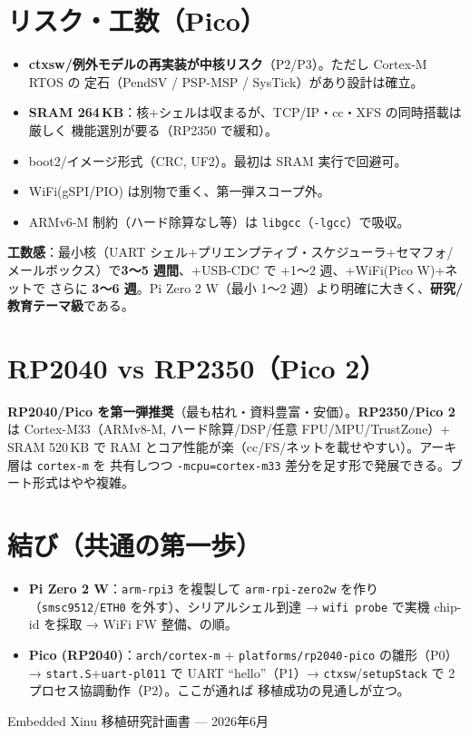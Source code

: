 \documentclass[a4paper,11pt]{ltjsarticle}
\newcommand{\cmd}[1]{\texttt{#1}}
\begin{document}
\section{リスク・工数（Pico）}
\begin{itemize}[noitemsep]
  \item \textbf{ctxsw/例外モデルの再実装が中核リスク}（P2/P3）。ただし Cortex-M RTOS の
        定石（PendSV / PSP-MSP / SysTick）があり設計は確立。
  \item \textbf{SRAM 264\,KB}：核+シェルは収まるが、TCP/IP・cc・XFS の同時搭載は厳しく
        機能選別が要る（RP2350 で緩和）。
  \item boot2/イメージ形式（CRC, UF2）。最初は SRAM 実行で回避可。
  \item WiFi(gSPI/PIO) は別物で重く、第一弾スコープ外。
  \item ARMv6-M 制約（ハード除算なし等）は \texttt{libgcc}（\texttt{-lgcc}）で吸収。
\end{itemize}
\textbf{工数感}：最小核（UART シェル+プリエンプティブ・スケジューラ+セマフォ/
メールボックス）で\textbf{3〜5 週間}、+USB-CDC で +1〜2 週、+WiFi(Pico W)+ネットで
さらに \textbf{3〜6 週}。Pi Zero 2 W（最小 1〜2 週）より明確に大きく、\textbf{研究/
教育テーマ級}である。

\section{RP2040 vs RP2350（Pico 2）}
\textbf{RP2040/Pico を第一弾推奨}（最も枯れ・資料豊富・安価）。\textbf{RP2350/Pico 2}
は Cortex-M33（ARMv8-M, ハード除算/DSP/任意 FPU/MPU/TrustZone）+ SRAM 520\,KB で
RAM とコア性能が楽（cc/FS/ネットを載せやすい）。アーキ層は \texttt{cortex-m} を
共有しつつ \texttt{-mcpu=cortex-m33} 差分を足す形で発展できる。ブート形式はやや複雑。

\section{結び（共通の第一歩）}
\begin{itemize}[noitemsep]
  \item \textbf{Pi Zero 2 W}：\texttt{arm-rpi3} を複製して \texttt{arm-rpi-zero2w}
        を作り（\texttt{smsc9512}/\texttt{ETH0} を外す）、シリアルシェル到達 →
        \cmd{wifi probe} で実機 chip-id を採取 → WiFi FW 整備、の順。
  \item \textbf{Pico (RP2040)}：\texttt{arch/cortex-m} + \texttt{platforms/rp2040-pico}
        の雛形（P0）→ \texttt{start.S}+\texttt{uart-pl011} で UART ``hello''（P1）→
        \texttt{ctxsw}/\texttt{setupStack} で 2 プロセス協調動作（P2）。ここが通れば
        移植成功の見通しが立つ。
\end{itemize}

\vfill
\begin{center}\small Embedded Xinu 移植研究計画書 — 2026年6月\end{center}
\end{document}
